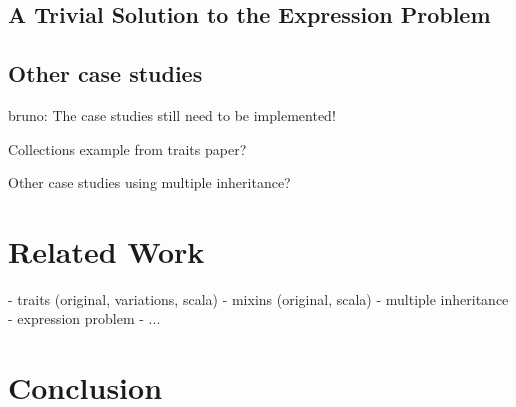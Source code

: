 \documentclass[preprint]{llncs}
\newcommand{\authornote}[3]{{\color{#2} {\sc #1}: #3}}
\newcommand\bruno[1]{\authornote{bruno}{red}{#1}}
\begin{document}
\subsection{A Trivial Solution to the Expression Problem}

\subsection{Other case studies} 
\bruno{The case studies still need to be implemented!}

Collections example from traits paper? 

Other case studies using multiple inheritance?

\section{Related Work}\label{sec:related}

- traits (original, variations, scala)
- mixins (original, scala)
- multiple inheritance 
- expression problem
- ...

\section{Conclusion}\label{sec:conclusion}





\appendix
\end{document}
